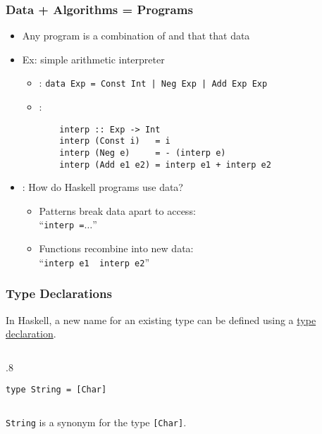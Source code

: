 \documentclass{beamer}
\newenvironment{codeblock}[1][.8]{%
\begin{columns}
\begin{column}{#1\linewidth}
\begin{exampleblock}{}}{%
\end{exampleblock}
\end{column}
\end{columns}}
\def\slideskip{\vskip 0.1in}
\begin{document}
\begin{frame}[fragile]
\frametitle{Data + Algorithms = Programs}
\begin{itemize}

\item Any program is a combination of {\color{red}{data structures}} and {\color{blue}{code}} that  {\color{green}{manipulates}} that data

\pause
\item Ex: simple arithmetic interpreter
	\begin{itemize}
    \item {\color{red}{data structure}}: \verb+data Exp = Const Int | Neg Exp | Add Exp Exp+
    \item {\color{blue}{code}}:
    \begin{verbatim}
    interp :: Exp -> Int
    interp (Const i)   = i
    interp (Neg e)     = - (interp e)
    interp (Add e1 e2) = interp e1 + interp e2
    \end{verbatim}
	\end{itemize}
\pause

\item {\color{green}{Manipulation}}: How do Haskell programs use data?
\begin{itemize}
\item Patterns break data apart to access: \\``{\small{\tt interp {\color{red}{(Neg e)}} =$\ldots$}}''
\item Functions recombine into new data: \\``{\small{\tt interp e1 {\bf{\color{red}{+}}} interp e2}}''
\end{itemize}

\end{itemize}
\end{frame}


\begin{frame}[fragile]
\Large

\frametitle{Type Declarations}

In Haskell, a new name for an existing type can be 
defined using a \underline{type declaration}. 

\slideskip

\begin{codeblock}
\vspace{-2ex}
\begin{verbatim}
type String = [Char] 
\end{verbatim}
\vspace{-2ex}
\end{codeblock}

\slideskip

{\tt String} is a synonym for the type \verb+[Char]+.
\end{frame}
\end{document}
